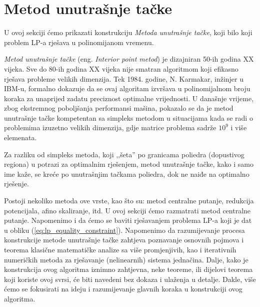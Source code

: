 \documentclass[b5paper, utf8, 11pt, colorlinks]{book}
\theoremstyle{definition}
\begin{document}
\appendix

\chapter{Metod unutrašnje tačke} \label{appendix:interior_point}



U ovoj sekciji ćemo prikazati konstrukciju  \emph{Metoda unutrašnje tačke}, koji  bilo koji problem LP-a rješava  u polinomijanom vremenu.


\emph{Metod unutrašnje tačke} (eng. \emph{Interior point metod}) je dizajniran 50-ih godina XX vijeka. Sve do 80-ih godina XX vijeka nije smatran algoritmom koji efikasno  rješava probleme velikih dimenzija. Tek 1984. godine, N. Karmakar, inžinjer u IBM-u,  formalno dokazuje da se ovaj algoritam izvršava u polinomijalnom broju koraka za unaprijed zadatu preciznost optimalne vrijednosti. U današnje vrijeme, zbog ekstremnog poboljšanja performansi mašina, pokazalo se da je {metod unutrašnje tačke} kompetentan sa simpleks metodom u situacijama kada se radi o problemima izuzetno velikih dimenzija, gdje matrice problema sadrže $10^9$ i više elemenata.

Za razliku od simpleks metoda, koji ,,šeta'' po granicama poliedra (dopustivog regiona) u potrazi za optimalnim rješenjem, {metod unutrašnje tačke}, kako i samo ime kaže, se kreće po unutrašnjim tačkama poliedra,  dok ne naiđe na  optimalno rješenje. 

Postoji nekoliko metoda ove vrste, kao što su: metod centralne putanje, redukcija potencijala, afino skaliranje, itd. U ovoj sekciji ćemo razmatrati metod centralne putanje. Napomenimo i da ćemo se baviti rješavanjem problema LP-a koji je dat u obliku (\ref{eq:lp_equality_constraint}). Napomenimo da razumijevanje procesa konstrukcije metode  unutrašnje tačke zahtjeva poznavanje osnovnih pojmova i teorema klasične matematičke analize sa više promjenjivih, kao i iterativnih numeričkih metoda za rješavanje (nelinearnih) sistema jednačina. Dalje, kako je konstrukcija ovog algoritma iznimno zahtjevna, neke teoreme, ili dijelovi teorema koji koriste ovoj svrsi, će biti  navedeni bez dokaza i ulaženja u detalje. Dakle, više ćemo se fokusirati na ideju i razumijevanje glavnih koraka u konstrukciji ovog algoritma.
\end{document}
